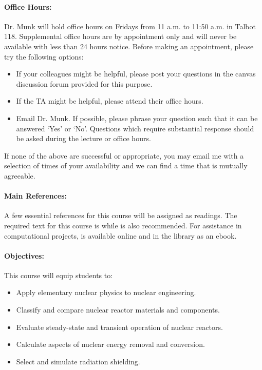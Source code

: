 \documentclass[11pt, a4paper]{article}
\begin{document}
\paragraph{Office Hours:} Dr. Munk  will hold office hours on Fridays from 11
a.m.
to 11:50 a.m. in Talbot 118. Supplemental office hours are by appointment only
and will never be available with less than 24 hours notice.
Before making an appointment, please try the following options:
\begin{itemize}
\item If your colleagues might be helpful, please post your questions in the
        canvas discussion forum provided for this purpose.
\item If the TA might be helpful, please attend their office hours.
\item Email Dr. Munk. If possible, please phrase your question such that it
        can be answered `Yes' or `No'.  Questions which require substantial
        response should be asked during the lecture or office hours.
\end{itemize}

If none of the above are successful or appropriate, you may email me with a
selection of times of your availability and we can find a time that is mutually
agreeable.

\paragraph{Main References:}
A few essential references for this course will be assigned as readings. The
required text for this course is \cite{shultis_fundamentals_2016} while
\cite{lamarsh_introduction_2017} is also recommended. For assistance in
computational projects, \cite{scopatz_effective_2015} is available online and
in the library as an ebook.


\renewcommand{\refname}{\normalfont\selectfont\normalsize}\vspace{-1cm}


\paragraph{Objectives:}

This course will equip students to:

\begin{itemize}
\item Apply elementary nuclear physics to nuclear engineering.
\item Classify and compare nuclear reactor materials and components.
\item Evaluate steady-state and transient operation of nuclear reactors.
\item Calculate aspects of nuclear energy removal and conversion.
\item Select and simulate radiation shielding.
\end{itemize}
\end{document}
